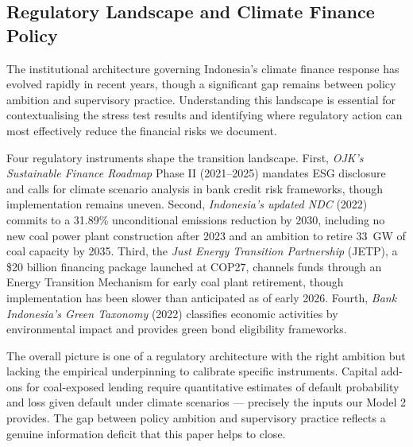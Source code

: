 \subsection{Regulatory Landscape and Climate Finance Policy}
\label{subsec:regulatory_landscape}

The institutional architecture governing Indonesia's climate finance response has evolved rapidly in recent years, though a significant gap remains between policy ambition and supervisory practice. Understanding this landscape is essential for contextualising the stress test results and identifying where regulatory action can most effectively reduce the financial risks we document.

Four regulatory instruments shape the transition landscape. First, \textit{OJK's Sustainable Finance Roadmap} Phase II (2021--2025) mandates ESG disclosure and calls for climate scenario analysis in bank credit risk frameworks, though implementation remains uneven. Second, \textit{Indonesia's updated NDC} (2022) commits to a 31.89\% unconditional emissions reduction by 2030, including no new coal power plant construction after 2023 and an ambition to retire 33~GW of coal capacity by 2035. Third, the \textit{Just Energy Transition Partnership} (JETP), a \$20 billion financing package launched at COP27, channels funds through an Energy Transition Mechanism for early coal plant retirement, though implementation has been slower than anticipated as of early 2026. Fourth, \textit{Bank Indonesia's Green Taxonomy} (2022) classifies economic activities by environmental impact and provides green bond eligibility frameworks.

The overall picture is one of a regulatory architecture with the right ambition but lacking the empirical underpinning to calibrate specific instruments. Capital add-ons for coal-exposed lending require quantitative estimates of default probability and loss given default under climate scenarios --- precisely the inputs our Model 2 provides. The gap between policy ambition and supervisory practice reflects a genuine information deficit that this paper helps to close.



